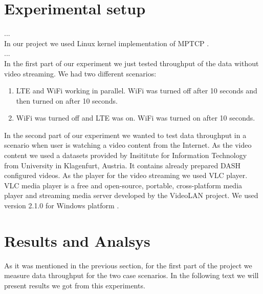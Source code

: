 \documentclass{llncs}
\begin{document}
\section{Experimental setup}
... 
\\
In our project we used Linux kernel implementation of MPTCP \cite{linuxMPTCP}. 
\\
...
\\
In the first part of our experiment we just tested throughput of the data without video streaming. We had two different scenarios:

\begin{enumerate}
\item{LTE and WiFi working in parallel. WiFi was turned off after 10 seconds and then turned on after 10 seconds.}
\item{WiFi was turned off and LTE was on. WiFi was turned on after 10 seconds.}
\end{enumerate}

In the second part of our experiment we wanted to test data throughput in a scenario when user is watching a video content from the Internet. As the video content we used a datasets  \cite{dataset} provided by Insititute for Information Technology from University in Klagenfurt, Austria. It contains already prepared DASH configured videos. As the player for the video streaming we used VLC player. VLC media player is a free and open-source, portable, cross-platform media player and streaming media server developed by the VideoLAN project. We used version 2.1.0 for Windows platform \cite{VLC}. 

\section{Results and Analsys}
As it was mentioned in the previous section, for the first part of the project we measure data throughput for the two case scenarios. In the following text we will present results we got from this experiments.
\end{document}
